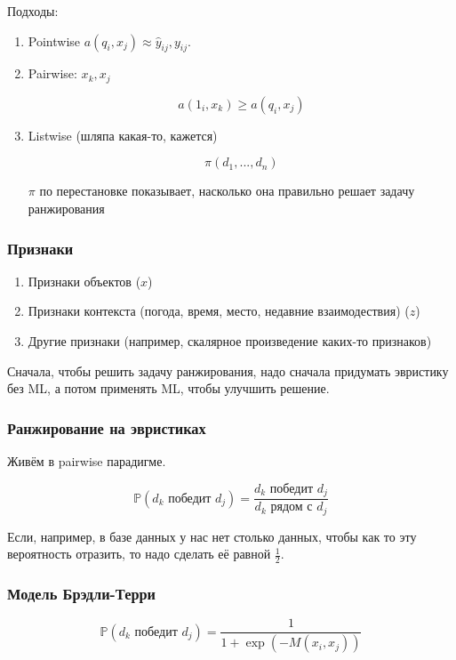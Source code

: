 \documentclass[a4paper]{article}
\begin{document}
Подходы:

\begin{enumerate}
\item Pointwise $a(q_i, x_j) \approx \hat{y}_{ij}, y_{ij}$.
\item Pairwise:
$x_k, x_j$

\[ a(1_i, x_k) \geq a(q_i, x_j) \]

\item Listwise (шляпа какая-то, кажется)

\[ \pi(d_1, ..., d_n) \]

$\pi$ по перестановке показывает, насколько она правильно решает задачу ранжирования

\end{enumerate}

\subsubsection*{Признаки}

\begin{enumerate}
\item Признаки объектов ($x$)
\item Признаки контекста (погода, время, место, недавние взаимодествия) ($z$)
\item Другие признаки (например, скалярное произведение каких-то признаков)
\end{enumerate}

Сначала, чтобы решить задачу ранжирования, надо сначала придумать эвристику без ML, а потом применять ML, чтобы улучшить решение.

\subsubsection*{Ранжирование на эвристиках}

Живём в pairwise парадигме.

\[ \mathbb{P}(d_k \text{  победит  } d_j) = \frac{d_k \text{  победит  } d_j} {d_k \text{  рядом с  } d_j}\]

Если, например, в базе данных у нас нет столько данных, чтобы как то эту вероятность отразить, то надо сделать её равной $\frac{1}{2}$.

\subsubsection*{Модель Брэдли-Терри}

\[ \mathbb{P}(d_k \text{  победит  } d_j) = \frac{1}{1+\exp(- M(x_i, x_j))} \]
\end{document}
